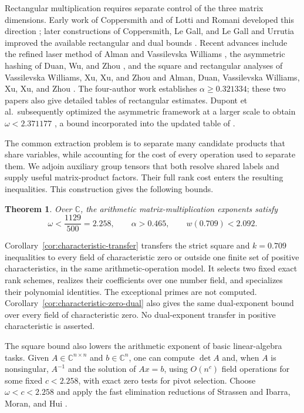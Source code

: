 \documentclass[11pt]{article}
\numberwithin{equation}{section}
\newtheorem{theorem}{Theorem}[section]
\theoremstyle{definition}
\theoremstyle{remark}
\begin{document}
Rectangular multiplication requires separate control of the three
matrix dimensions.  Early work of Coppersmith and of Lotti and Romani
developed this direction \cite{coppersmith1982,lottiromani1983}; later
constructions of Coppersmith, Le Gall, and Le Gall and Urrutia improved
the available rectangular and dual bounds
\cite{coppersmith-rect,legall-rect,legall-urrutia}.
Recent advances include the refined laser method of Alman and
Vassilevska Williams \cite{alman-williams}, the asymmetric hashing of
Duan, Wu, and Zhou \cite{duan-wu-zhou}, and the square and rectangular
analyses of Vassilevska Williams, Xu, Xu, and Zhou \cite{vxxz} and
Alman, Duan, Vassilevska Williams, Xu, Xu, and Zhou \cite{advxxz}.
The four-author work establishes \(\alpha\ge0.321334\); these two
papers also give detailed tables of rectangular estimates.
Dupont et al.\ subsequently optimized the asymmetric framework at
a larger scale to obtain \(\omega<2.371177\)
\cite{dupont}, a bound incorporated into the updated table of
\cite{advxxz}.

The common extraction problem is to separate many candidate products
that share variables, while accounting for the cost of every operation
used to separate them.  We adjoin auxiliary group tensors that both
resolve shared labels and supply useful matrix-product factors.  Their
full rank cost enters the resulting inequalities.  This construction
gives the following bounds.

\begin{theorem}\label{thm:main}\label{thm:square}\label{thm:rectangular}
Over \(\mathbb C\), the arithmetic matrix-multiplication exponents satisfy
\[
 \omega<\frac{1129}{500}=2.258,\qquad
 \alpha>0.465,\qquad w(0.709)<2.092.
\]
\end{theorem}

Corollary~\ref{cor:characteristic-transfer} transfers the strict square
and \(k=0.709\) inequalities to every field of characteristic zero or
outside one finite set of positive characteristics, in the same
arithmetic-operation model.  It selects two fixed exact rank schemes,
realizes their coefficients over one number field, and specializes
their polynomial identities.  The exceptional primes are not computed.
Corollary~\ref{cor:characteristic-zero-dual} also gives the same
dual-exponent bound over every field of characteristic zero.
No dual-exponent transfer in positive characteristic is asserted.

The square bound also lowers the arithmetic exponent of basic
linear-algebra tasks.  Given \(A\in\mathbb C^{n\times n}\) and
\(b\in\mathbb C^n\), one can compute \(\det A\) and, when \(A\) is
nonsingular, \(A^{-1}\) and the solution of \(Ax=b\), using
\(O(n^c)\) field operations for some fixed \(c<2.258\), with exact
zero tests for pivot selection.  Choose \(\omega<c<2.258\) and apply
the fast elimination reductions of Strassen \cite{strassen} and
Ibarra, Moran, and Hui
\cite[Theorem~2.1 and Corollary~2.1]{ibarra-moran-hui}.
\end{document}
